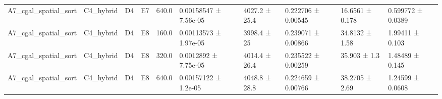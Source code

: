 \begin{table}
\begin{tabular}{llllllllll}
A7\_cgal\_spatial\_sort & C4\_hybrid & D4 & E7 & 640.0 & 0.00158547 ± 7.56e-05 & 4027.2 ± 25.4 & 0.222706 ± 0.00545 & 16.6561 ± 0.178 & 0.599772 ± 0.0389 \\
A7\_cgal\_spatial\_sort & C4\_hybrid & D4 & E8 & 160.0 & 0.00113573 ± 1.97e-05 & 3998.4 ± 25 & 0.239071 ± 0.00866 & 34.8132 ± 1.58 & 1.99411 ± 0.103 \\
A7\_cgal\_spatial\_sort & C4\_hybrid & D4 & E8 & 320.0 & 0.0012892 ± 7.75e-05 & 4014.4 ± 26.4 & 0.235522 ± 0.00259 & 35.903 ± 1.3 & 1.48489 ± 0.145 \\
A7\_cgal\_spatial\_sort & C4\_hybrid & D4 & E8 & 640.0 & 0.00157122 ± 1.2e-05 & 4048.8 ± 28.8 & 0.224659 ± 0.00766 & 38.2705 ± 2.69 & 1.24599 ± 0.0608 \\
\bottomrule
\end{tabular}
\end{table}

